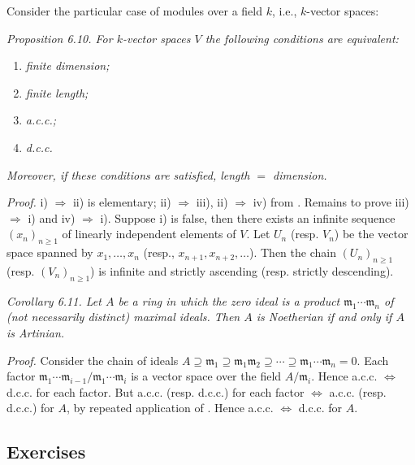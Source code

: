 Consider the particular case of modules over a field $k$, i.e., $k$-vector spaces:

\noindent\textit{Proposition 6.10. For $k$-vector spaces $V$ the following conditions are equivalent:}
\begin{enumerate}
\renewcommand{\labelenumi}{\roman{enumi})}
\item \textit{finite dimension;}
\item \textit{finite length;}
\item \textit{a.c.c.;}
\item \textit{d.c.c.}
\end{enumerate}
\textit{Moreover, if these conditions are satisfied, length $={}$ dimension.}

\noindent\textit{Proof.} i) $\Rightarrow$ ii) is elementary; ii) $\Rightarrow$ iii), ii) $\Rightarrow$ iv) from . Remains to prove iii) $\Rightarrow$ i) and iv) $\Rightarrow$ i). Suppose i) is false, then there exists an infinite sequence $(x_n)_{n\geq1}$ of linearly independent elements of $V$. Let $U_n$ (resp. $V_n$) be the vector space spanned by $x_1,\ldots,x_n$ (resp., $x_{n+1},x_{n+2},\ldots$). Then the chain $(U_n)_{n\geq1}$ (resp. $(V_n)_{n\geq1}$) is infinite and strictly ascending (resp. strictly descending).

\noindent\textit{Corollary 6.11. Let $A$ be a ring in which the zero ideal is a product $\mathfrak m_1\cdots\mathfrak m_n$ of (not necessarily distinct) maximal ideals. Then $A$ is Noetherian if and only if $A$ is Artinian.}

\noindent\textit{Proof.} Consider the chain of ideals $A\supseteq\mathfrak m_1\supseteq\mathfrak m_1\mathfrak m_2\supseteq\cdots\supseteq\mathfrak m_1\cdots\mathfrak m_n=0$. Each factor $\mathfrak m_1\cdots\mathfrak m_{i-1}/\mathfrak m_1\cdots\mathfrak m_i$ is a vector space over the field $A/\mathfrak m_i$. Hence a.c.c. $\Longleftrightarrow$ d.c.c. for each factor. But a.c.c. (resp. d.c.c.) for each factor $\Longleftrightarrow$ a.c.c. (resp. d.c.c.) for $A$, by repeated application of . Hence a.c.c. $\Longleftrightarrow$ d.c.c. for $A$. \proofbox

\subsection{Exercises}

